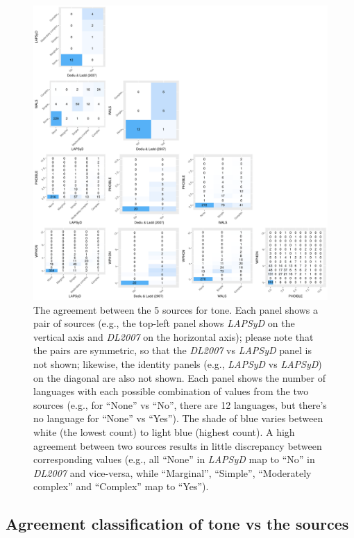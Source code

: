\documentclass[twoside,onecolumn]{article}
\begin{document}
\begin{figure}[h]
  \centering
  \includegraphics[width=\textwidth]{../../code/figures/tone_agreement_sources}
  \caption{The agreement between the 5 sources for tone. Each panel shows a pair of sources (e.g., the top-left panel shows \textit{LAPSyD} on the vertical axis and \textit{DL2007} on the horizontal axis); please note that the pairs are symmetric, so that the \textit{DL2007} vs \textit{LAPSyD} panel is not shown; likewise, the identity panels (e.g., \textit{LAPSyD} vs \textit{LAPSyD}) on the diagonal are also not shown. Each panel shows the number of languages with each possible combination of values from the two sources (e.g., for ``None'' vs ``No'', there are 12 languages, but there's no language for ``None'' vs ``Yes''). The shade of blue varies between white (the lowest count) to light blue (highest count). A high agreement between two sources results in little discrepancy between corresponding values (e.g., all ``None'' in \textit{LAPSyD} map to ``No'' in \textit{DL2007} and vice-versa, while ``Marginal'', ``Simple'', ``Moderately complex'' and ``Complex'' map to ``Yes'').}
  \label{Fig:tone_agreement_sources}
\end{figure}


\subsection{Agreement classification of tone vs the sources} \label{SM:tone_agreeemnt_with_sources}
\end{document}

